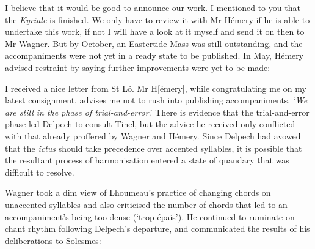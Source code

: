   {}
{I believe that it would be good to announce our work. I mentioned to you that the \emph{Kyriale} is finished. We only have to review it with Mr Hémery if he is able to undertake this work, if not I will have a look at it myself and send it on then to Mr Wagner.}
\noindent
But by October, an Eastertide Mass was still outstanding, and the accompaniments were not yet in a ready state to be published.
In May, Hémery advised restraint by saying further improvements were yet to be made:
\pagebreak{}

  {}
{I received a nice letter from St Lô. Mr H[émery], while congratulating me on my latest consignment, advises me not to rush into publishing accompaniments. `\emph{We are still in the phase of trial-and-error}.'}
\noindent
There is evidence that the trial-and-error phase led Delpech to consult Tinel, but the advice he received only conflicted with that already proffered by Wagner and Hémery.
Since Delpech had avowed that the \emph{ictus} should take precedence over accented syllables, it is possible that the resultant process of harmonisation entered a state of quandary that was difficult to resolve.

Wagner took a dim view of Lhoumeau's practice of changing chords on unaccented syllables and also criticised the number of chords that led to an accompaniment's being too dense (`trop épais').
He continued to ruminate on chant rhythm following Delpech's departure, and communicated the results of his deliberations to Solesmes:

